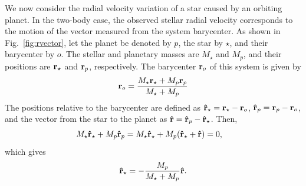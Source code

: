 We now consider the radial velocity variation of a star caused by an orbiting planet. In the two-body case, the observed stellar radial velocity corresponds to the motion of the vector measured from the system barycenter. As shown in Fig.~\ref{fig:rvector}, let the planet be denoted by $p$, the star by $\star$, and their barycenter by $o$. The stellar and planetary masses are $M_\star$ and $M_p$, and their positions are ${\bf r}_\star$ and ${\bf r}_p$, respectively. The barycenter ${\bf r}_o$ of this system is given by
\begin{eqnarray}
{\bf r}_o = \frac{M_\star {\bf r}_\star+ M_p {\bf r}_p}{M_\star + M_p}
\label{eq:rbary}
\end{eqnarray}
The positions relative to the barycenter are defined as ${\bf \hat{r}}_\star = {\bf r}_\star - {\bf r}_o$, ${\bf \hat{r}}_p = {\bf r}_p - {\bf r}_o$, and the vector from the star to the planet as ${\bf \hat{r}} = {\bf \hat{r}}_p - {\bf \hat{r}}_\star$. Then,
\begin{align}
\label{eq:barycentsp}
M_\star {\bf \hat{r}}_\star + M_p {\bf \hat{r}}_p &= M_\star {\bf \hat{r}}_\star + M_p ({\bf \hat{r}}_\star + {\bf \hat{r}} ) = 0 ,
\end{align}
which gives
\begin{eqnarray}
\label{eq:relpossp}
{\bf \hat{r}}_\star = - \frac{M_p}{M_\star + M_p} {\bf \hat{r}} .
\end{eqnarray}


